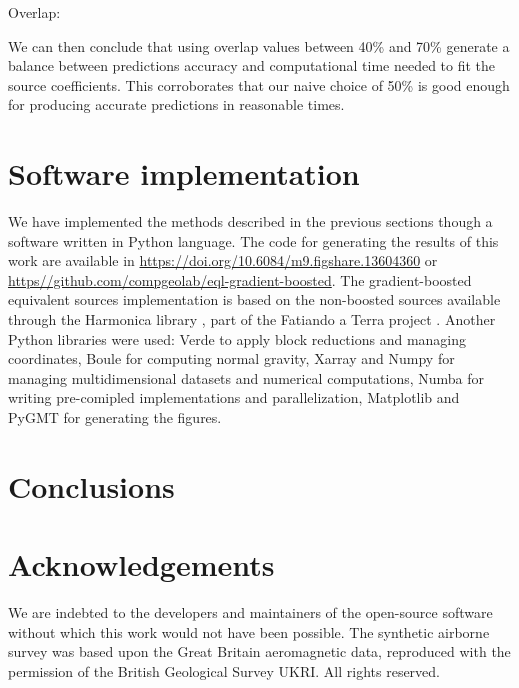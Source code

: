 \documentclass[twocolumn]{article}
\begin{document}
Overlap:

We can then conclude that using overlap values between 40\% and 70\% generate
a balance between predictions accuracy and computational time needed to fit the
source coefficients.
This corroborates that our naive choice of 50\% is good enough for producing
accurate predictions in reasonable times.


\section{Software implementation}

We have implemented the methods described in the previous sections though
a software written in Python language.
The code for generating the results of this work are available in
\url{https://doi.org/10.6084/m9.figshare.13604360} or
\url{https//github.com/compgeolab/eql-gradient-boosted}.
The gradient-boosted equivalent sources implementation is based on the
non-boosted sources available through the Harmonica library
\citep{harmonica2020}, part of the Fatiando a Terra project
\citep{fatiando2013}.
Another Python libraries were used:
Verde \citep{verde2018} to apply block reductions and managing coordinates,
Boule \citep{boule2020} for computing normal gravity,
Xarray \citep{xarray2017} and Numpy \citep{numpy2020} for managing
multidimensional datasets and numerical
computations,
Numba \citep{numba2015} for writing pre-comipled implementations and
parallelization,
Matplotlib \citep{matplotlib2007} and PyGMT \citep{pygmt2020} for generating
the figures.


\section{Conclusions}


\section{Acknowledgements}

We are indebted to the developers and maintainers of the open-source software
without which this work would not have been possible.
The synthetic airborne survey was based upon the Great Britain aeromagnetic
data, reproduced with the permission of the British Geological Survey
\textcopyright{} UKRI.
All rights reserved.
\end{document}
